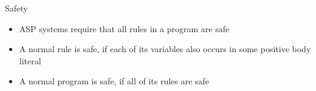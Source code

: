 \begin{frame}{Safety}
  \bigskip
  \begin{itemize}
  \item ASP systems require that all rules in a program are safe
    \bigskip
  \item A normal rule is \alert{safe}, if each of its variables also occurs in some positive body literal
    \medskip
  \item A normal program is safe, if all of its rules are safe
  \end{itemize}
\end{frame}
%
